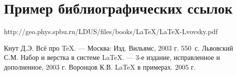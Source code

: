 \documentclass[12pt,a4paper]{scrartcl}
\begin{document}
\section{Пример библиографических ссылок}
    http://geo.phys.spbu.ru/LDUS/files/books/LaTeX/LaTeX-Lvovsky.pdf
	
	\begin{thebibliography}{9}
		Кнут Д.Э. Всё про \TeX. \newblock --- Москва: Изд. Вильямс, 2003 г. 550~с.
		Львовский С.М. Набор и верстка в системе \LaTeX{}. \newblock --- 3-е издание, исправленное и дополненное, 2003 г.
		Воронцов К.В. \LaTeX{} в примерах. 2005 г.
	\end{thebibliography}
\end{document}
